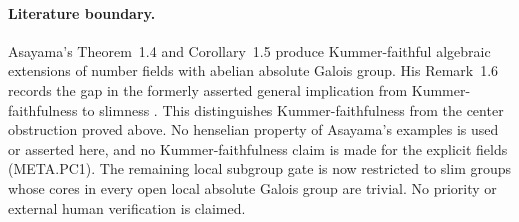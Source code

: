 \paragraph{Literature boundary.}
Asayama's Theorem~1.4 and Corollary~1.5 produce
Kummer-faithful algebraic extensions of number fields
with abelian absolute Galois group.
His Remark~1.6 records the gap in the formerly
asserted general implication from Kummer-faithfulness
to slimness \citep{AN_Asayama2026}.
This distinguishes Kummer-faithfulness from the
center obstruction proved above.
No henselian property of Asayama's examples is
used or asserted here, and no Kummer-faithfulness
claim is made for the explicit fields (META.PC1).
The remaining local subgroup gate is now restricted
to slim groups whose cores in every open
local absolute Galois group are trivial.
No priority or external human verification is claimed.
